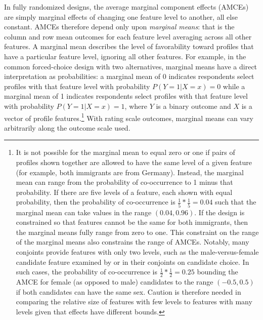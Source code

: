 \documentclass[a4paper,12pt]{article}\usepackage[]{graphicx}\usepackage[]{color}
\begin{document}
In fully randomized designs, the average marginal component effects (AMCEs) are simply marginal effects of changing one feature level to another, all else constant. AMCEs therefore depend only upon \textit{marginal means}: that is the column and row mean outcomes for each feature level averaging across all other features. A marginal mean describes the level of favorability toward profiles that have a particular feature level, ignoring all other features. For example, in the common forced-choice design with two alternatives, marginal means have a direct interpretation as probabilities: a marginal mean of 0 indicates respondents select profiles with that feature level with probability $P(Y=1|X=x) = 0$ while a marginal mean of 1 indicates respondents select profiles with that feature level with probability $P(Y=1|X=x)=1$, where $Y$ is a binary outcome and $X$ is a vector of profile features.\footnote{It is not possible for the marginal mean to equal zero or one if pairs of profiles shown together are allowed to have the same level of a given feature (for example, both immigrants are from Germany). Instead, the marginal mean can range from the probability of co-occurrence to 1 minus that probability. If there are five levels of a feature, each shown with equal probability, then the probability of co-occurrence is $\frac{1}{5}*\frac{1}{5} = 0.04$ such that the marginal mean can take values in the range $(0.04,0.96)$. If the design is constrained so that features cannot be the same for both immigrants, then the marginal means fully range from zero to one. This constraint on the range of the marginal means also constrains the range of AMCEs. Notably, many conjoints provide features with only two levels, such as the male-versus-female candidate feature examined by \citet{TeeleKallaRosenbluth2018} or \citet{HainmuellerHopkinsYamamoto2014} in their conjoints on candidate choice. In such cases, the probability of co-occurrence is $\frac{1}{2}*\frac{1}{2} = 0.25$ bounding the AMCE for female (as opposed to male) candidates to the range $(-0.5, 0.5)$ if both candidates can have the same sex. Caution is therefore needed in comparing the relative size of features with few levels to features with many levels given that effects have different bounds.} With rating scale outcomes, marginal means can vary arbitrarily along the outcome scale used.
\end{document}
